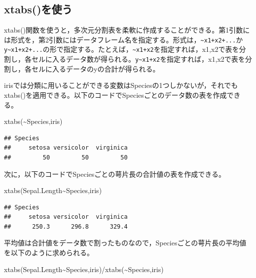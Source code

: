 \documentclass[
]{book}
\newenvironment{Shaded}{\begin{snugshade}}{\end{snugshade}}
\newcommand{\FunctionTok}[1]{\textcolor[rgb]{0.00,0.00,0.00}{#1}}
\newcommand{\NormalTok}[1]{#1}
\newcommand{\SpecialCharTok}[1]{\textcolor[rgb]{0.00,0.00,0.00}{#1}}
\begin{document}
\hypertarget{xtabsux3092ux4f7fux3046}{%
\subsection{xtabs()を使う}\label{xtabsux3092ux4f7fux3046}}

xtabs()関数を使うと，多次元分割表を柔軟に作成することができる。第1引数には形式を，第2引数にはデータフレーム名を指定する。形式は，\texttt{\textasciitilde{}x1+x2+...}か\texttt{y\textasciitilde{}x1+x2+...}の形で指定する。たとえば，\texttt{\textasciitilde{}x1+x2}を指定すれば，x1,x2で表を分割し，各セルに入るデータ数が得られる。\texttt{y\textasciitilde{}x1+x2}を指定すれば，x1,x2で表を分割し，各セルに入るデータのyの合計が得られる。

irisでは分類に用いることができる変数はSpeciesの1つしかないが，それでもxtabs()を適用できる。以下のコードでSpeciesごとのデータ数の表を作成できる。

\begin{Shaded}
\begin{Highlighting}[]
\FunctionTok{xtabs}\NormalTok{(}\SpecialCharTok{\textasciitilde{}}\NormalTok{Species,iris)}
\end{Highlighting}
\end{Shaded}

\begin{verbatim}
## Species
##     setosa versicolor  virginica 
##         50         50         50
\end{verbatim}

次に，以下のコードでSpeciesごとの萼片長の合計値の表を作成できる。

\begin{Shaded}
\begin{Highlighting}[]
\FunctionTok{xtabs}\NormalTok{(Sepal.Length}\SpecialCharTok{\textasciitilde{}}\NormalTok{Species,iris)}
\end{Highlighting}
\end{Shaded}

\begin{verbatim}
## Species
##     setosa versicolor  virginica 
##      250.3      296.8      329.4
\end{verbatim}

平均値は合計値をデータ数で割ったものなので，Speciesごとの萼片長の平均値を以下のように求められる。

\begin{Shaded}
\begin{Highlighting}[]
\FunctionTok{xtabs}\NormalTok{(Sepal.Length}\SpecialCharTok{\textasciitilde{}}\NormalTok{Species,iris)}\SpecialCharTok{/}\FunctionTok{xtabs}\NormalTok{(}\SpecialCharTok{\textasciitilde{}}\NormalTok{Species,iris)}
\end{Highlighting}
\end{Shaded}
\end{document}
